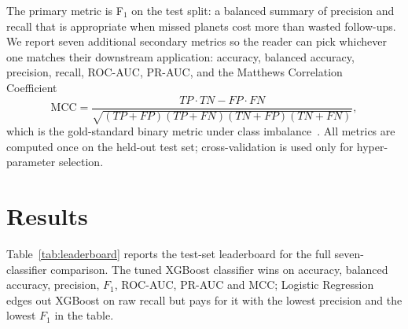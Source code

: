 \documentclass[conference]{IEEEtran}
\begin{document}
The primary metric is F$_1$ on the test split: a balanced summary of
precision and recall that is appropriate when missed planets cost more
than wasted follow-ups. We report seven additional secondary metrics
so the reader can pick whichever one matches their downstream
application: accuracy, balanced accuracy, precision, recall, ROC-AUC,
PR-AUC, and the Matthews Correlation Coefficient~\cite{matthews1975mcc}
\begin{equation}
  \mathrm{MCC} =
  \frac{TP\cdot TN - FP\cdot FN}{\sqrt{(TP+FP)(TP+FN)(TN+FP)(TN+FN)}},
\end{equation}
which is the gold-standard binary metric under class
imbalance~\cite{chicco2020advantages}. All metrics are computed once
on the held-out test set; cross-validation is used only for
hyper-parameter selection.

\section{Results}\label{sec:results}

Table~\ref{tab:leaderboard} reports the test-set leaderboard for
the full seven-classifier comparison. The tuned XGBoost classifier
wins on accuracy, balanced accuracy, precision, $F_1$, ROC-AUC,
PR-AUC and MCC; Logistic Regression edges out XGBoost on raw
recall but pays for it with the lowest precision and the lowest
$F_1$ in the table.
\end{document}
